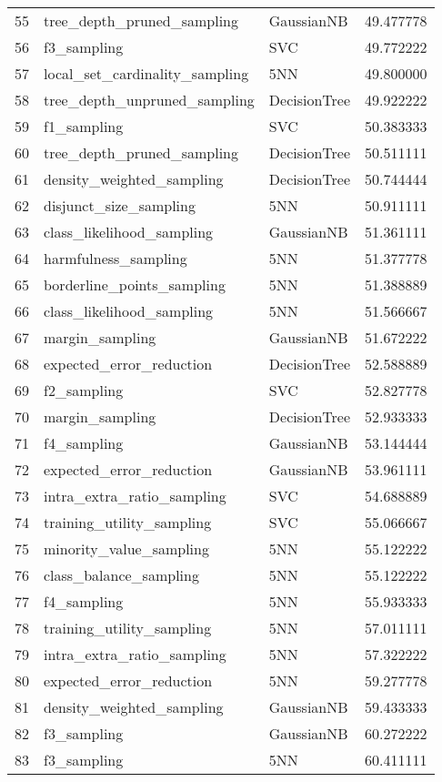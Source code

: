 \begin{tabular}{lllr}
55 & tree_depth_pruned_sampling & GaussianNB & 49.477778 \\
56 & f3_sampling & SVC & 49.772222 \\
57 & local_set_cardinality_sampling & 5NN & 49.800000 \\
58 & tree_depth_unpruned_sampling & DecisionTree & 49.922222 \\
59 & f1_sampling & SVC & 50.383333 \\
60 & tree_depth_pruned_sampling & DecisionTree & 50.511111 \\
61 & density_weighted_sampling & DecisionTree & 50.744444 \\
62 & disjunct_size_sampling & 5NN & 50.911111 \\
63 & class_likelihood_sampling & GaussianNB & 51.361111 \\
64 & harmfulness_sampling & 5NN & 51.377778 \\
65 & borderline_points_sampling & 5NN & 51.388889 \\
66 & class_likelihood_sampling & 5NN & 51.566667 \\
67 & margin_sampling & GaussianNB & 51.672222 \\
68 & expected_error_reduction & DecisionTree & 52.588889 \\
69 & f2_sampling & SVC & 52.827778 \\
70 & margin_sampling & DecisionTree & 52.933333 \\
71 & f4_sampling & GaussianNB & 53.144444 \\
72 & expected_error_reduction & GaussianNB & 53.961111 \\
73 & intra_extra_ratio_sampling & SVC & 54.688889 \\
74 & training_utility_sampling & SVC & 55.066667 \\
75 & minority_value_sampling & 5NN & 55.122222 \\
76 & class_balance_sampling & 5NN & 55.122222 \\
77 & f4_sampling & 5NN & 55.933333 \\
78 & training_utility_sampling & 5NN & 57.011111 \\
79 & intra_extra_ratio_sampling & 5NN & 57.322222 \\
80 & expected_error_reduction & 5NN & 59.277778 \\
81 & density_weighted_sampling & GaussianNB & 59.433333 \\
82 & f3_sampling & GaussianNB & 60.272222 \\
83 & f3_sampling & 5NN & 60.411111 \\

\end{tabular}
